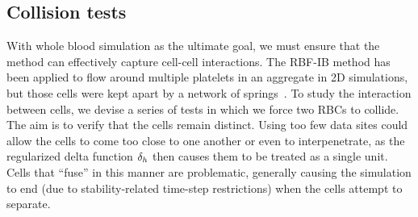 \subsection{Collision tests}

With whole blood simulation as the ultimate goal, we must ensure that the method can effectively capture cell-cell
interactions. The RBF-IB method has been applied to flow around multiple platelets in an aggregate in 2D simulations, but those
cells were kept apart by a network of springs~\cite{Shankar:2015km}. To study the interaction between cells, we
devise a series of tests in which we force two RBCs to collide. The aim is to verify that the cells remain
distinct. Using too few data sites could allow the cells to come too close to one another or even to interpenetrate, as the regularized delta function $\delta_h$ then causes them to be treated as a single unit. Cells that ``fuse'' in this manner are problematic,
generally causing the simulation to end (due to stability-related time-step restrictions) when the cells attempt to separate.

